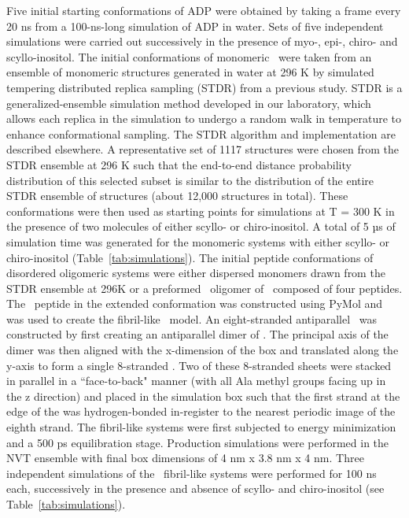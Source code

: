 Five initial starting conformations of ADP were obtained by taking a frame every 20 ns from a 100-ns-long simulation of ADP in water. Sets of five independent simulations were carried out successively in the presence of myo-, epi-, chiro- and scyllo-inositol. The initial conformations of monomeric \gafour\ were taken from an ensemble of monomeric structures generated in water at 296 K by simulated tempering distributed replica sampling (STDR) from a previous study.\cite{Nikolic:2011p57} STDR is a generalized-ensemble simulation method developed in our laboratory, which allows each replica in the simulation to undergo a random walk in temperature to enhance conformational sampling.\cite{Rodinger:2006p78} The STDR algorithm and implementation are described elsewhere.\cite{Rauscher:2009p41} A representative set of 1117 structures were chosen from the STDR ensemble at 296 K such that the end-to-end distance probability distribution of this selected subset is similar to the distribution of the entire STDR ensemble of structures (about 12,000 structures in total). These conformations were then used as starting points for simulations at T = 300 K in the presence of two molecules of either scyllo- or chiro-inositol. A total of 5 µs of simulation time was generated for the monomeric systems with either scyllo- or chiro-inositol (Table~\ref{tab:simulations}). The initial peptide conformations of disordered oligomeric systems were either dispersed monomers drawn from the STDR ensemble at 296K or a preformed \bsheet\ oligomer of \gafour\ composed of four peptides.
	The \gafour\ peptide in the extended conformation was constructed using PyMol and was used to create the fibril-like \bsheet\ model. An eight-stranded antiparallel \bsheet\ was constructed by first creating an antiparallel dimer of \gafour. The principal axis of the dimer was then aligned with the x-dimension of the box and translated along the y-axis to form a single 8-stranded \bsheet. Two of these 8-stranded sheets were stacked in parallel in a ``face-to-back" manner (with all Ala methyl groups facing up in the z direction) and placed in the simulation box such that the first strand at the edge of the \bsheets was hydrogen-bonded in-register to the nearest periodic image of the eighth strand. The fibril-like systems were first subjected to energy minimization and a 500 ps equilibration stage. Production simulations were performed in the NVT ensemble with final box dimensions of 4 nm x 3.8 nm x 4 nm. Three independent simulations of the \gafour\ fibril-like systems were performed for 100 ns each, successively in the presence and absence of scyllo- and chiro-inositol (see Table~\ref{tab:simulations}).

